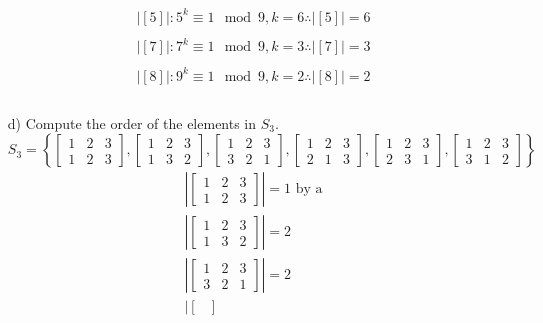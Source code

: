 \documentclass[11pt]{article}
\theoremstyle{definition}  %
\begin{document}
\begin{itemize}
\begin{align*}
       &|[5]|:5^k\equiv 1 \mod 9, k=6\therefore |[5]|=6\\\\
       &|[7]|:7^k\equiv 1 \mod 9, k=3\therefore |[7]|=3\\\\
       &|[8]|:9^k\equiv 1 \mod 9, k=2\therefore |[8]|=2\\\\
     \end{align*}
     \item[d)] Compute the order of the elements in $S_3$.
    $$
    S_3=\left\{
    \begin{bmatrix}
      1&2&3\\
      1&2&3
    \end{bmatrix},
    \begin{bmatrix}
      1&2&3\\
      1&3&2
    \end{bmatrix},
    \begin{bmatrix}
      1&2&3\\
      3&2&1
    \end{bmatrix},
    \begin{bmatrix}
      1&2&3\\
      2&1&3
    \end{bmatrix},
    \begin{bmatrix}
      1&2&3\\
      2&3&1
    \end{bmatrix},
    \begin{bmatrix}
      1&2&3\\
      3&1&2
    \end{bmatrix}\right\}$$
    \begin{align*}
      &\left|
      \begin{bmatrix}
        1&2&3\\
        1&2&3
      \end{bmatrix}
      \right|=1 \text{ by a}\\
      &\left|
      \begin{bmatrix}
        1&2&3\\
        1&3&2
      \end{bmatrix}
      \right|=2 \\
      &\left|
      \begin{bmatrix}
        1&2&3\\
        3&2&1
      \end{bmatrix}
      \right|=2 \\
      &\left|
      \begin{bmatrix}

\end{bmatrix}
\end{align*}
\end{itemize}
\end{document}
